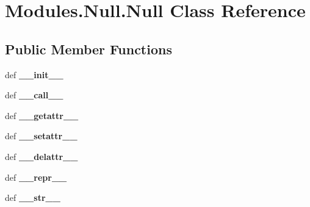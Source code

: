 \hypertarget{classModules_1_1Null_1_1Null}{\section{Modules.\-Null.\-Null Class Reference}
\label{classModules_1_1Null_1_1Null}
}
\subsection*{Public Member Functions}
\begin{DoxyCompactItemize}
\item 
\hypertarget{classModules_1_1Null_1_1Null_a7ff8cd6663d734a7582d4e588397244a}{def {\bfseries \-\_\-\-\_\-init\-\_\-\-\_\-}}\label{classModules_1_1Null_1_1Null_a7ff8cd6663d734a7582d4e588397244a}

\item 
\hypertarget{classModules_1_1Null_1_1Null_a8dd490d1b8537063dfb4da44e83d9c6b}{def {\bfseries \-\_\-\-\_\-call\-\_\-\-\_\-}}\label{classModules_1_1Null_1_1Null_a8dd490d1b8537063dfb4da44e83d9c6b}

\item 
\hypertarget{classModules_1_1Null_1_1Null_a4b43a6ade37c83bcb6caf3c97a5236a3}{def {\bfseries \-\_\-\-\_\-getattr\-\_\-\-\_\-}}\label{classModules_1_1Null_1_1Null_a4b43a6ade37c83bcb6caf3c97a5236a3}

\item 
\hypertarget{classModules_1_1Null_1_1Null_a577f0ba8a74805faca305691bd073a27}{def {\bfseries \-\_\-\-\_\-setattr\-\_\-\-\_\-}}\label{classModules_1_1Null_1_1Null_a577f0ba8a74805faca305691bd073a27}

\item 
\hypertarget{classModules_1_1Null_1_1Null_ad0e1184289fca7a72de66c52f25a30ca}{def {\bfseries \-\_\-\-\_\-delattr\-\_\-\-\_\-}}\label{classModules_1_1Null_1_1Null_ad0e1184289fca7a72de66c52f25a30ca}

\item 
\hypertarget{classModules_1_1Null_1_1Null_a05705a6e24061ba0713a446a7b82c513}{def {\bfseries \-\_\-\-\_\-repr\-\_\-\-\_\-}}\label{classModules_1_1Null_1_1Null_a05705a6e24061ba0713a446a7b82c513}

\item 
\hypertarget{classModules_1_1Null_1_1Null_ad8ab52973b61c6f93d80fec18bb81da9}{def {\bfseries \-\_\-\-\_\-str\-\_\-\-\_\-}}\label{classModules_1_1Null_1_1Null_ad8ab52973b61c6f93d80fec18bb81da9}

\end{DoxyCompactItemize}


